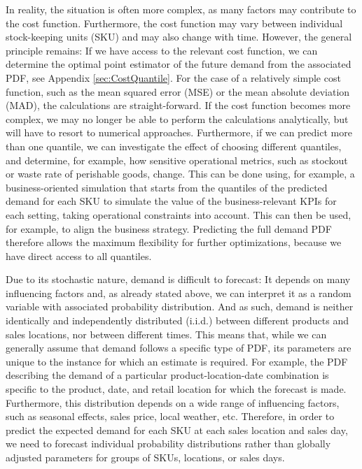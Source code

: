 \documentclass[BCOR=1mm, DIV=calc,10pt,
twoside=true,
twocolumn,
headings=normal]{scrartcl}
\begin{document}
In reality, the situation is often more complex, as many factors may contribute to the cost function. Furthermore, the cost function may vary between individual stock-keeping units (SKU) and may also change with time. However, the general principle remains: If we have access to the relevant cost function, we can determine the optimal point estimator of the future demand from the associated PDF, see Appendix \ref{sec:CostQuantile}. For the case of a relatively simple cost function, such as the mean squared error (MSE) or the mean absolute deviation (MAD), the calculations are straight-forward. If the cost function becomes more complex, we may no longer be able to perform the calculations analytically, but will have to resort to numerical approaches. Furthermore, if we can predict more than one quantile, we can investigate the effect of choosing different quantiles, and determine, for example, how sensitive operational metrics, such as stockout or waste rate of perishable goods, change. This can be done using, for example, a business-oriented simulation that starts from the quantiles of the predicted demand for each SKU to simulate the value of the business-relevant KPIs for each setting, taking operational constraints into account. This can then be used, for example, to align the business strategy. Predicting the full demand PDF therefore allows the maximum flexibility for further optimizations, because we have direct access to all quantiles.

Due to its stochastic nature, demand is difficult to forecast: It depends on many influencing factors and, as already stated above, we can interpret it as a random variable with associated probability distribution. And as such, demand is neither identically and independently distributed (i.i.d.) between different products and sales locations, nor between different times. This means that, while we can generally assume that demand follows a specific type of PDF, its parameters are unique to the instance for which an estimate is required. For example, the PDF describing the demand of a particular product-location-date combination is specific to the product, date, and retail location for which the forecast is made. Furthermore, this distribution depends on a wide range of influencing factors, such as seasonal effects, sales price, local weather, etc. Therefore, in order to predict the expected demand for each SKU at each sales location and sales day, we need to forecast individual probability distributions rather than globally adjusted parameters for groups of SKUs, locations, or sales days.
\end{document}
